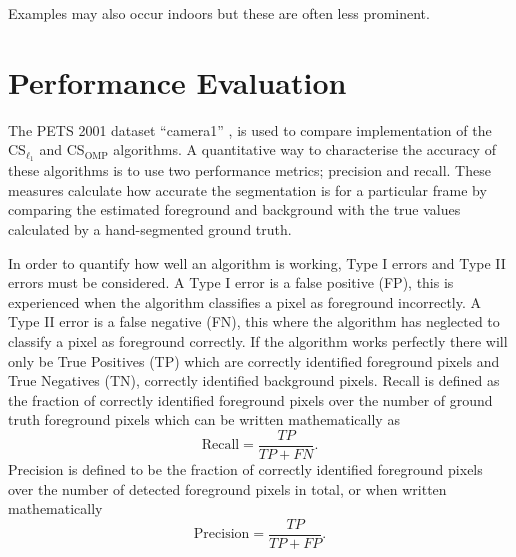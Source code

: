 Examples may also occur indoors but these are often less prominent.



\section{Performance Evaluation}\label{sec:results}

The PETS 2001 dataset ``camera1''  \cite{pets2001},  is used to compare implementation of the CS$_{\ell_1}$ and CS$_{\text{OMP}}$ algorithms. A quantitative way to characterise the accuracy of these algorithms is to use two performance metrics; precision and recall.  These measures calculate how accurate the segmentation is for a particular frame by comparing the estimated foreground and background with the true values calculated by a hand-segmented ground truth.

In order to quantify how well an algorithm is working, Type I errors and Type II errors must be considered. A Type I error is a false positive (FP), this is experienced when the algorithm classifies a pixel as foreground incorrectly. A Type II error is a false negative (FN), this where the algorithm has neglected to classify a pixel as foreground correctly. If the algorithm works perfectly there will only be True Positives (TP) which are correctly identified foreground pixels and True Negatives (TN), correctly identified background pixels.
Recall is defined as the fraction of correctly identified foreground pixels over the number of ground truth foreground pixels which can be written mathematically as
\begin{equation}
  \label{eq:1}
\text{Recall} = \frac{TP}{TP + FN}. 
\end{equation}
Precision is defined to be the fraction of correctly identified foreground pixels over the number of detected foreground pixels in total, or when written mathematically
\begin{equation}
  \label{eq:2}
\text{Precision} = \frac{TP}{TP + FP}.
\end{equation} 

